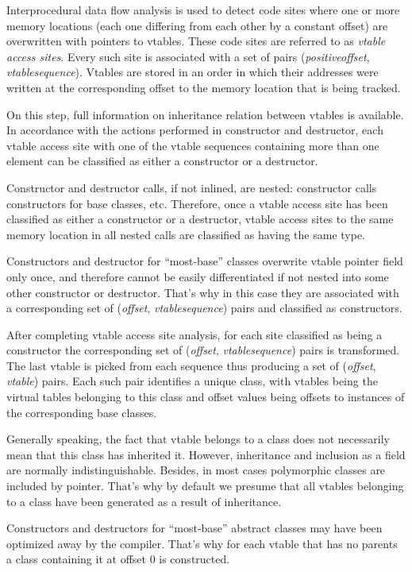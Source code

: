 \documentclass[10pt, conference]{IEEEtran}
\newcommand{\offset}{\textit{offset}}
\newcommand{\vtable}{\textit{vtable}}
\newcommand{\positive}{\textit{positive}}
\newcommand{\sequence}{\textit{sequence}}
\begin{document}
Interprocedural data flow analysis is used to detect
code sites where one or more memory locations (each one differing
from each other by a constant offset) are overwritten with
pointers to vtables.
These code sites are referred to as \textit{vtable access sites}.
Every such site is associated with
a set of pairs (\positive\:\offset, \vtable\:\sequence).
Vtables are stored in an order in which their addresses
were written at the corresponding offset to the memory location that is
being tracked.

On this step, full information on inheritance relation
between vtables is available. In accordance with the actions performed
in constructor and destructor, each vtable access site with one of the
vtable sequences containing more than one element can be classified as
either a constructor or a destructor.

Constructor and destructor calls, if not inlined, are nested:
constructor calls constructors for base classes, etc.
Therefore, once a vtable access site has been classified as either
a constructor or a destructor, vtable access sites to the same memory
location in all nested calls are classified as having the same type.

Constructors and destructor for ``most-base'' classes
overwrite vtable pointer field only once, and therefore
cannot be easily differentiated if not nested into some other
constructor or destructor. That's why in this case they are
associated with a corresponding set of (\offset, \vtable\:\sequence) pairs
and classified as constructors.

After completing vtable access site analysis, for each site
classified as being a constructor the
corresponding set of (\offset, \vtable\:\sequence) pairs
is transformed. The last vtable is picked from each sequence
thus producing a set of (\offset, \vtable) pairs. Each
such pair identifies a unique class, with vtables being
the virtual tables belonging to this class and offset values
being offsets to instances of the corresponding base classes.

Generally speaking, the fact that vtable belongs to a class does not
necessarily mean that this class has inherited it.
However, inheritance and inclusion as a field are normally indistinguishable.
Besides, in most cases polymorphic classes are included by pointer.
That's why by default we presume that all vtables belonging to
a class have been generated as a result of inheritance.

Constructors and destructors for ``most-base'' abstract classes
may have been optimized away by the compiler. That's why for each
vtable that has no parents
a class containing it at offset 0 is constructed.
\end{document}
